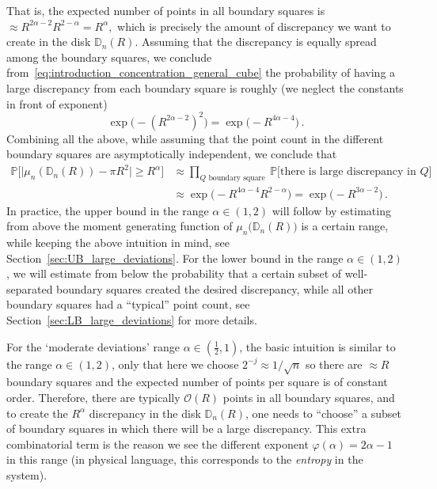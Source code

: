 \documentclass[11pt]{amsart}
\theoremstyle{definition}
\theoremstyle{remark}
\numberwithin{equation}{section}
\newcommand{\bD}{\mathbb D}
\newcommand{\bP}{\mathbb P}
\begin{document}
	That is, the expected number of points in all boundary squares is $\approx R^{2\alpha-2} R^{2-\alpha} = R^{\alpha},$ which is precisely the amount of discrepancy we want to create in the disk $\bD_n(R)$. Assuming that the discrepancy is equally spread among the boundary squares, we conclude from~\eqref{eq:introduction_concentration_general_cube} the probability of having a large discrepancy from each boundary square is roughly (we neglect the constants in front of exponent)
	\[
	\exp\Big(-(R^{2\alpha-2})^2\Big) = \exp\Big(-R^{4\alpha-4}\Big) \, .
	\]
	Combining all the above, while assuming that the point count in the different boundary squares are asymptotically independent, we conclude that
	\begin{align*}
		\bP\Big[\big|\mu_n(\bD_n(R)) - \pi R^2\big| \ge R^\alpha \Big] 
		& \approx \prod_{Q \text{ boundary square }} \bP\Big[ \text{there is large discrepancy in } Q \Big] \\
		& \approx \exp\Big(-R^{4\alpha-4} R^{2-\alpha} \Big) = \exp\Big(-R^{3\alpha-2}\Big)\, .
	\end{align*}
	In practice, the upper bound in the range $\alpha\in(1,2)$ will follow by estimating from above the moment generating function of $\mu_n\big(\bD_n(R)\big)$ is a certain range, while keeping the above intuition in mind, see Section~\ref{sec:UB_large_deviations}. For the lower bound in the range $\alpha\in(1,2)$, we will estimate from below the probability that a certain subset of well-separated boundary squares created the desired discrepancy, while all other boundary squares had a ``typical'' point count, see Section~\ref{sec:LB_large_deviations} for more details.
	
	
	For the `moderate deviations' range $\alpha\in(\tfrac{1}{2},1)$, the basic intuition is similar to the range $\alpha\in(1,2)$, only that here we choose $2^{-j}\approx 1/\sqrt{n}$ so there are $\approx R$ boundary squares and the expected number of points per square is of constant order. Therefore, there are typically $\mathcal{O}(R)$ points in all boundary squares, and to create the $R^{\alpha}$ discrepancy in the disk $\bD_n(R)$, one needs to ``choose'' a subset of boundary squares in which there will be a large discrepancy. This extra combinatorial term is the reason we see the different exponent $\varphi(\alpha) = 2\alpha-1$ in this range (in physical language, this corresponds to the \emph{entropy} in the system).
	
\end{document}
